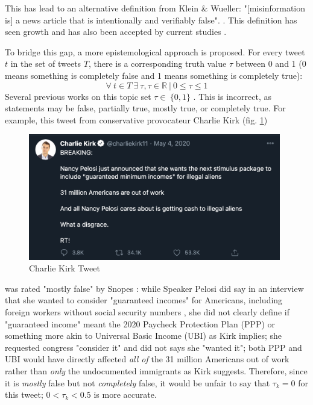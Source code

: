 \documentclass[12pt]{article}
\begin{document}
This has lead to an alternative definition from Klein \& Wueller: "[misinformation is] a news article that is intentionally and verifiably false". \cite{klein2017fake}. This definition has seen growth and has also been accepted by current studies \cite{shu2017fake, liu2018early}.

To bridge this gap, a more epistemological approach is proposed. For every tweet $t$ in the set of tweets $T$, there is a corresponding truth value $\tau$ between 0 and 1 (0 means something is completely false and 1 means something is completely true):
\begin{equation}
\label{truthvalues}
    \forall \ t \in T \ \exists \ \tau, \tau \in \mathbb{R} \ | \ 0 \leq \tau \leq 1
\end{equation}
Several previous works on this topic set $\tau \in \ \{0,1\}$ \cite{liu2018early,shu2017fake}. This is incorrect, as statements may be false, partially true, mostly true, or completely true. For example, this tweet from conservative provocateur Charlie Kirk (fig. \ref{fig:Charlie Kirk Tweet, May 4, 2020})  \begin{figure}[h]
    \centering
    \includegraphics[width=11cm]{CharlieKirk Tweet.png}
    \caption{Charlie Kirk Tweet}
    \label{fig:Charlie Kirk Tweet, May 4, 2020}
\end{figure} was rated "mostly false" by Snopes \cite{lee2020pelosi}: while Speaker Pelosi did say in an interview that she wanted to consider "guaranteed incomes" for Americans, including foreign workers without social security numbers \cite{pelosi2020maher}, she did not clearly define if "guaranteed income" meant the 2020 Paycheck Protection Plan (PPP) or something more akin to Universal Basic Income (UBI) as Kirk implies; she requested congress "consider it" and did not says she "wanted it"; both PPP and UBI would have directly affected \textit{all of} the 31 million Americans out of work rather than \textit{only} the undocumented immigrants as Kirk suggests. Therefore, since it is \textit{mostly} false but not \textit{completely} false, it would be unfair to say that $\tau_k = 0$ for this tweet; $ 0 < \tau_k < 0.5$ is more accurate. 
\end{document}
